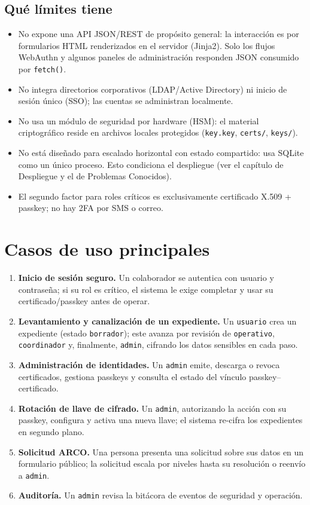 \documentclass[10pt,letterpaper]{report}
\begin{document}
\subsection*{Qu\'e l\'imites tiene}
\begin{itemize}
  \item No expone una API JSON/REST de prop\'osito general: la interacci\'on es por
  formularios HTML renderizados en el servidor (Jinja2). Solo los flujos WebAuthn y algunos paneles
  de administraci\'on responden JSON consumido por \texttt{fetch()}.
  \item No integra directorios corporativos (LDAP/Active Directory) ni inicio de sesi\'on \'unico
  (SSO); las cuentas se administran localmente.
  \item No usa un m\'odulo de seguridad por hardware (HSM): el material criptogr\'afico reside en
  archivos locales protegidos (\texttt{key.key}, \texttt{certs/}, \texttt{keys/}).
  \item No est\'a dise\~nado para escalado horizontal con estado compartido: usa SQLite como un
  \'unico proceso. Esto condiciona el despliegue (ver el cap\'itulo de Despliegue y el de
  Problemas Conocidos).
  \item El segundo factor para roles cr\'iticos es exclusivamente certificado X.509 + passkey; no
  hay 2FA por SMS o correo.
\end{itemize}

\section{Casos de uso principales}
\begin{enumerate}
  \item \textbf{Inicio de sesi\'on seguro.} Un colaborador se autentica con usuario y contrase\~na;
  si su rol es cr\'itico, el sistema le exige completar y usar su certificado/passkey antes de
  operar.
  \item \textbf{Levantamiento y canalizaci\'on de un expediente.} Un \texttt{usuario} crea un
  expediente (estado \texttt{borrador}); este avanza por revisi\'on de \texttt{operativo},
  \texttt{coordinador} y, finalmente, \texttt{admin}, cifrando los datos sensibles en cada paso.
  \item \textbf{Administraci\'on de identidades.} Un \texttt{admin} emite, descarga o revoca
  certificados, gestiona passkeys y consulta el estado del v\'inculo passkey--certificado.
  \item \textbf{Rotaci\'on de llave de cifrado.} Un \texttt{admin}, autorizando la acci\'on con su
  passkey, configura y activa una nueva llave; el sistema re-cifra los expedientes en segundo plano.
  \item \textbf{Solicitud ARCO.} Una persona presenta una solicitud sobre sus datos en un formulario
  p\'ublico; la solicitud escala por niveles hasta su resoluci\'on o reenv\'io a \texttt{admin}.
  \item \textbf{Auditor\'ia.} Un \texttt{admin} revisa la bit\'acora de eventos de seguridad y
  operaci\'on.
\end{enumerate}
\end{document}
